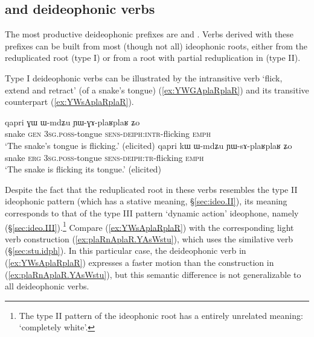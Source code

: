 \subsection{ and  deideophonic verbs} \label{sec:GA.sA.deidph}
The most productive deideophonic prefixes are  and . Verbs derived with these prefixes can be built from most (though not all) ideophonic roots, either from the reduplicated root (type I) or from a root with partial reduplication in  (type II).

Type I deideophonic verbs can be illustrated by the intransitive verb  `flick, extend and retract' (of a snake's tongue) (\ref{ex:YWGAplaRplaR}) and its transitive counterpart  (\ref{ex:YWsAplaRplaR}). 

\begin{exe}
\ex
\begin{xlist}
\ex \label{ex:YWGAplaRplaR}
\gll   qapri ɣɯ ɯ-mdʑu ɲɯ-ɣɤ-plaʁplaʁ ʑo \\
snake \textsc{gen} \textsc{3sg}.\textsc{poss}-tongue \textsc{sens}-\textsc{deiph}:\textsc{intr}-flicking \textsc{emph} \\
\glt `The snake's tongue is flicking.' (elicited)
\ex \label{ex:YWsAplaRplaR}
\gll   qapri kɯ ɯ-mdʑu ɲɯ-sɤ-plaʁplaʁ ʑo \\
snake \textsc{erg} \textsc{3sg}.\textsc{poss}-tongue \textsc{sens}-\textsc{deiph}:\textsc{tr}-flicking \textsc{emph} \\
\glt `The snake is flicking its tongue.' (elicited)
\end{xlist}
\end{exe}

Despite the fact that the reduplicated root  in these verbs resembles the type II ideophonic pattern (which has a stative meaning, §\ref{sec:ideo.II}), its meaning corresponds to that of the type III pattern `dynamic action' ideophone, namely  (§\ref{sec:ideo.III}).\footnote{The type II pattern  of the ideophonic root  has a entirely unrelated meaning: `completely white'.} Compare (\ref{ex:YWsAplaRplaR}) with the corresponding light verb construction (\ref{ex:plaRnAplaR.YAsWstu}), which uses the similative verb  (§\ref{sec:stu.idph}). In this particular case, the deideophonic verb in (\ref{ex:YWsAplaRplaR}) expresses a faster motion than the construction in (\ref{ex:plaRnAplaR.YAsWstu}), but this semantic difference is not generalizable to all deideophonic verbs.

